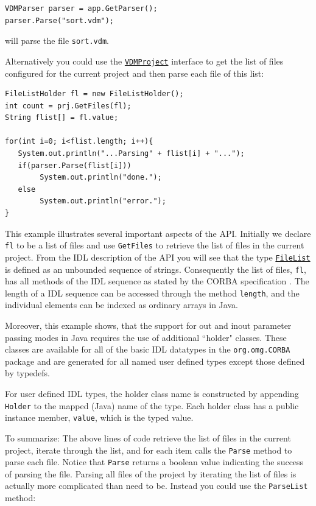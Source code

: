 \documentclass[\pformat,12pt]{article}
\newcommand{\FileList}{\hyperlink{type.FileList}{FileList}}
\newcommand{\VDMProject}{\hyperlink{interface.VDMProject}{VDMProject}}
\begin{document}
\begin{verbatim}
VDMParser parser = app.GetParser();
parser.Parse("sort.vdm");
\end{verbatim}

will parse the file {\tt sort.vdm}.

Alternatively you could use the {\tt \VDMProject} interface to get the
list of files configured for the current project and then parse each
file of this list:

\begin{verbatim}
FileListHolder fl = new FileListHolder();
int count = prj.GetFiles(fl);
String flist[] = fl.value;
                
for(int i=0; i<flist.length; i++){
   System.out.println("...Parsing" + flist[i] + "...");
   if(parser.Parse(flist[i]))
        System.out.println("done.");
   else
        System.out.println("error.");
}
\end{verbatim}

This example illustrates several important aspects of the API.
Initially we declare {\tt fl} to be a list of files and use {\tt GetFiles}
to retrieve the list of files in the current project. From the IDL
description of the API you will see that the type {\tt \FileList} is defined
as an unbounded sequence of strings. Consequently the list of files,
{\tt fl}, has all methods of the IDL sequence as stated by the CORBA
specification \cite{OMG&96}. The length of a IDL sequence can be accessed
through the method {\tt length}, and the individual elements can be indexed
as ordinary arrays in Java.  

Moreover, this example shows, that the support for out and inout
parameter passing modes in Java requires the use of additional ``holder"
classes. These classes are available for all of the basic IDL
datatypes in the {\tt org.omg.CORBA} package and are generated for all named
user defined types except those defined by typedefs.

For user defined IDL types, the holder class name is constructed by
appending {\tt Holder} to the mapped (Java) name of the type.  Each holder
class has a public instance member, {\tt value}, which is the typed
value.

To summarize: The above lines of code retrieve the list of files in
the current project, iterate through the list, and for each item calls
the {\tt Parse} method to parse each file.  Notice that {\tt Parse}
returns a boolean value indicating the success of parsing the file.
Parsing all files of the project by iterating the list of files is
actually more complicated than need to be. Instead you could use the
{\tt ParseList} method:
\end{document}
